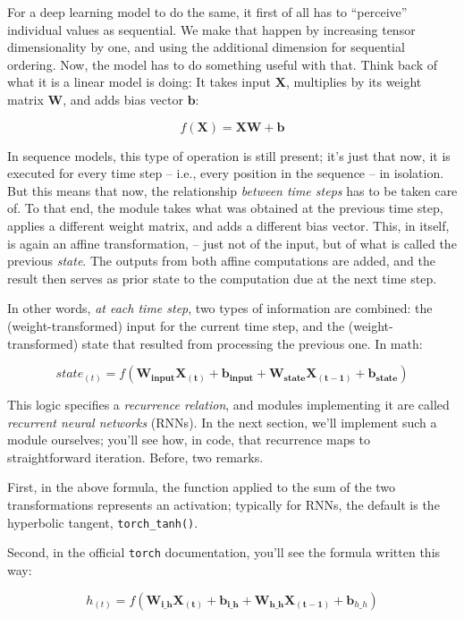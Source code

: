 \documentclass[
  letterpaper,
]{krantz}
\begin{document}
For a deep learning model to do the same, it first of all has to
``perceive'' individual values as sequential. We make that happen by
increasing tensor dimensionality by one, and using the additional
dimension for sequential ordering. Now, the model has to do something
useful with that. Think back of what it is a linear model is doing: It
takes input \(\mathbf{X}\), multiplies by its weight matrix
\(\mathbf{W}\), and adds bias vector \(\mathbf{b}\):

\[
f(\mathbf{X}) = \mathbf{X}\mathbf{W} + \mathbf{b}
\]

In sequence models, this type of operation is still present; it's just
that now, it is executed for every time step -- i.e., every position in
the sequence -- in isolation. But this means that now, the relationship
\emph{between time steps} has to be taken care of. To that end, the
module takes what was obtained at the previous time step, applies a
different weight matrix, and adds a different bias vector. This, in
itself, is again an affine transformation, -- just not of the input, but
of what is called the previous \emph{state}.
The outputs from both affine computations are added, and the result then
serves as prior state to the computation due at the next time step.

In other words, \emph{at each time step}, two types of information are
combined: the (weight-transformed) input for the current time step, and
the (weight-transformed) state that resulted from processing the
previous one. In math:

\[
state_{(t)} = f(\mathbf{W_{input}}\mathbf{X_{(t)}} + \mathbf{b_{input}} + \mathbf{W_{state}}\mathbf{X_{(t-1)}} + \mathbf{b_{state}})
\]

This logic specifies a \emph{recurrence relation}, and
modules implementing it are called \emph{recurrent neural networks}
(RNNs). In the next section, we'll implement such a module ourselves;
you'll see how, in code, that recurrence maps to straightforward
iteration. Before, two remarks.

First, in the above formula, the function applied to the sum of the two
transformations represents an activation; typically for RNNs, the
default is the hyperbolic tangent,
\texttt{torch\_tanh()}.

Second, in the official \texttt{torch} documentation, you'll see the
formula written this way:

\[
h_{(t)} = f(\mathbf{W_{i\_h}\mathbf{X_{(t)}} }+ \mathbf{b_{i\_h}} + \mathbf{W_{h\_h}\mathbf{X}_{(t-1)}} + \mathbf{b}_{h\_h})
\]
\end{document}
